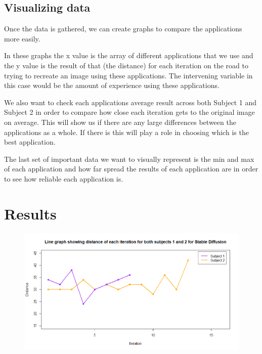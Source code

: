 \documentclass[]{report}
\begin{document}
	
	\subsection{Visualizing data}
	
	Once the data is gathered, we can create graphs to compare the applications more easily. 
	
	In these graphs the x value is the array of different applications that we use and the y value is the result of that (the distance) for each iteration on the road to trying to recreate an image using these applications. The intervening variable in this case would be the amount of experience using these applications.
	
	We also want to check each applications average result across both Subject 1 and Subject 2 in order to compare how close each iteration gets to the original image on average. This will show us if there are any large differences between the applications as a whole. If there is this will play a role in choosing which is the best application.
	
	The last set of important data we want to visually represent is the min and max of each application and how far spread the results of each application are in order to see how reliable each application is. 
	
	
	
	\pagebreak
	
	\section{Results}

	
    
	\begin{figure}[!!htbp]
		\centering
		\includegraphics[width=1\linewidth]{LineGraphStableDiff}
		\caption{}
		\label{fig:linegraphstablediff}
	\end{figure}
\end{document}
